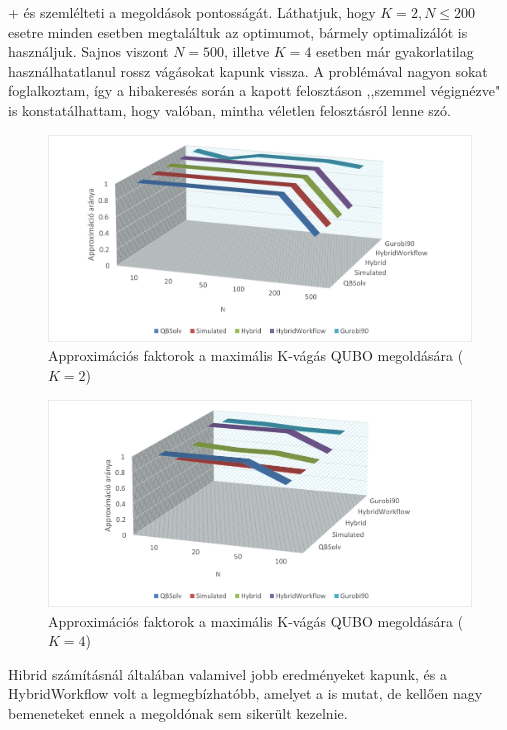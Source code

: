 \Az+ és  szemlélteti a megoldások pontosságát. Láthatjuk, hogy $K=2, N \leq 200$ esetre minden esetben megtaláltuk az optimumot, bármely optimalizálót is használjuk. Sajnos viszont $N=500$, illetve $K=4$ esetben már gyakorlatilag használhatatlanul rossz vágásokat kapunk vissza. A problémával nagyon sokat foglalkoztam, így a hibakeresés során a kapott felosztáson ,,szemmel végignézve" is konstatálhattam, hogy valóban, mintha véletlen felosztásról lenne szó.

\begin{figure}[!ht]
	\centering
	\includegraphics[width=150mm, keepaspectratio]{figures/diagrams/maxKCutQUBO_K2approx.png}
	\caption{Approximációs faktorok a maximális K-vágás QUBO megoldására ($K=2$)}
	\label{fig:maxKCutQUBO_K2approx}
\end{figure}

\begin{figure}[!ht]
	\centering
	\includegraphics[width=150mm, keepaspectratio]{figures/diagrams/maxKCutQUBO_K4approx.png}
	\caption{Approximációs faktorok a maximális K-vágás QUBO megoldására ($K=4$)}
	\label{fig:maxKCutQUBO_K4approx}
\end{figure}

Hibrid számításnál általában valamivel jobb eredményeket kapunk, és a HybridWorkflow volt a legmegbízhatóbb, amelyet a  is mutat, de kellően nagy bemeneteket ennek a megoldónak sem sikerült kezelnie.

